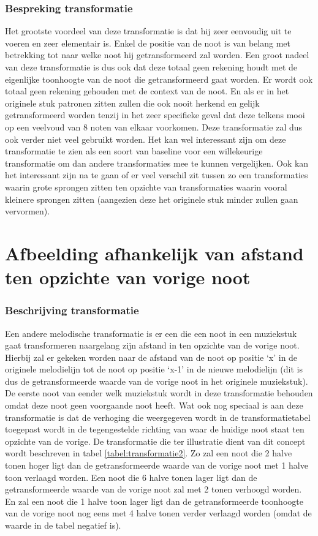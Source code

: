 \subsubsection{Bespreking transformatie}
Het grootste voordeel van deze transformatie is dat hij zeer eenvoudig uit te voeren en zeer elementair is. Enkel de positie van de noot is van belang met betrekking tot naar welke noot hij getransformeerd zal worden. Een groot nadeel van deze transformatie is dus ook dat deze totaal geen rekening houdt met de eigenlijke toonhoogte van de noot die getransformeerd gaat worden. Er wordt ook totaal geen rekening gehouden met de context van de noot. En als er in het originele stuk patronen zitten zullen die ook nooit herkend en gelijk getransformeerd worden tenzij in het zeer specifieke geval dat deze telkens mooi op een veelvoud van 8 noten van elkaar voorkomen. Deze transformatie zal dus ook verder niet veel gebruikt worden. Het kan wel interessant zijn om deze transformatie te zien als een soort van baseline voor een willekeurige transformatie om dan andere transformaties mee te kunnen vergelijken. Ook kan het interessant zijn na te gaan of er veel verschil zit tussen zo een transformaties waarin grote sprongen zitten ten opzichte van transformaties waarin vooral kleinere sprongen zitten (aangezien deze het originele stuk minder zullen gaan vervormen).

\section{Afbeelding afhankelijk van afstand ten opzichte van vorige noot}
\label{MT:afstand_vorige}
\subsubsection{Beschrijving transformatie}
Een andere melodische transformatie is er een die een noot in een muziekstuk gaat transformeren naargelang zijn afstand in ten opzichte van de vorige noot. Hierbij zal er gekeken worden naar de afstand van de noot op positie `x' in de originele melodielijn tot de noot op positie `x-1' in de nieuwe melodielijn (dit is dus de getransformeerde waarde van de vorige noot in het originele muziekstuk). De eerste noot van eender welk muziekstuk wordt in deze transformatie behouden omdat deze noot geen voorgaande noot heeft. Wat ook nog speciaal is aan deze transformatie is dat de verhoging die weergegeven wordt in de transformatietabel toegepast wordt in de tegengestelde richting van waar de huidige noot staat ten opzichte van de vorige. De transformatie die ter illustratie dient van dit concept wordt beschreven in tabel \ref{tabel:transformatie2}. Zo zal een noot die 2 halve tonen hoger ligt dan de getransformeerde waarde van de vorige noot met 1 halve toon verlaagd worden. Een noot die 6 halve tonen lager ligt dan de getransformeerde waarde van de vorige noot zal met 2 tonen verhoogd worden. En zal een noot die 1 halve toon lager ligt dan de getransformeerde toonhoogte van de vorige noot nog eens met 4 halve tonen verder verlaagd worden (omdat de waarde in de tabel negatief is).

